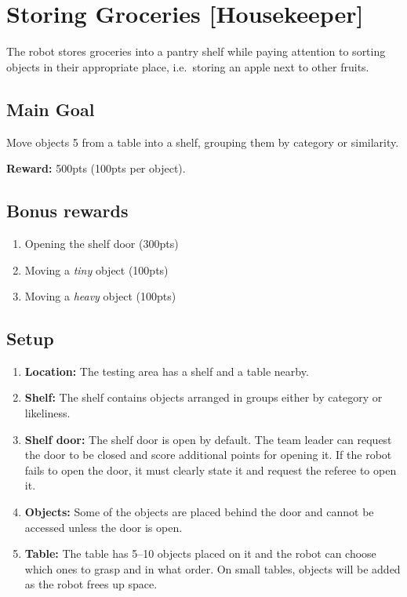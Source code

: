 \section{Storing Groceries [Housekeeper]}
The robot stores groceries into a pantry shelf while paying attention to sorting objects in their appropriate place, i.e.~storing an apple next to other fruits.


\subsection*{Main Goal}
Move objects 5 from a table into a shelf, grouping them by category or similarity.

\noindent\textbf{Reward:} 500pts (100pts per object).\\

\subsection*{Bonus rewards}
\begin{enumerate}[nosep]
	\item Opening the shelf door (300pts)
	\item Moving a \emph{tiny} object (100pts)
	\item Moving a \emph{heavy} object (100pts)
\end{enumerate}

%
%
\subsection*{Setup}
\begin{enumerate}
	\item \textbf{Location:} The testing area has a shelf and a table nearby.

	\item \textbf{Shelf:} The shelf contains objects arranged in groups either by category or likeliness.

	\item \textbf{Shelf door:} The shelf door is open by default.
	The team leader can request the door to be closed and score additional points for opening it. If the robot fails to open the door, it must clearly state it and request the referee to open it.

	\item \textbf{Objects:} Some of the objects are placed behind the door and cannot be accessed unless the door is open.

	\item \textbf{Table:} The table has 5--10 objects placed on it and the robot can choose which ones to grasp and in what order. On small tables, objects will be added as the robot frees up space.
\end{enumerate}


